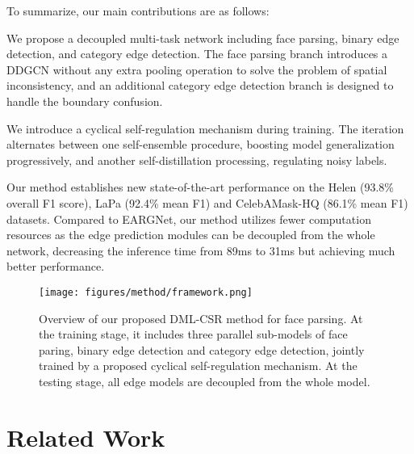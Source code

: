 \documentclass[10pt,twocolumn,letterpaper]{article}
\newenvironment{tight_itemize}{
\begin{itemize}[leftmargin=20pt]
  \setlength{\topsep}{0pt}
  \setlength{\itemsep}{0pt}
  \setlength{\parskip}{0pt}
  \setlength{\parsep}{0pt}
}{\end{itemize}}
\begin{document}
To summarize, our main contributions are as follows:
\vspace{-0.2cm}
\begin{tight_itemize}
\item We propose a decoupled multi-task network including face parsing, binary edge detection, and category edge detection. The face parsing branch introduces a DDGCN without any extra pooling operation to solve the problem of spatial inconsistency, and an additional category edge detection branch is designed to handle the boundary confusion.
\item We introduce a cyclical self-regulation mechanism during training. The iteration alternates between one self-ensemble procedure, boosting model generalization progressively, and another self-distillation processing, regulating noisy labels.
\item Our method establishes new state-of-the-art performance on the Helen\cite{helen} (93.8\% overall F1 score), LaPa\cite{lapa} (92.4\% mean F1) and CelebAMask-HQ\cite{CelebAMask-HQ} (86.1\% mean F1) datasets. Compared to EARGNet\cite{te2020edge}, our method utilizes fewer computation resources as the edge prediction modules can be decoupled from the whole network, decreasing the inference time from 89ms to 31ms but achieving much better performance.
\end{tight_itemize}

\begin{figure*}
\centering
\texttt{[image: figures/method/framework.png]}
\vspace{-2.5mm}
\caption{Overview of our proposed DML-CSR method for face parsing. At the training stage, it includes three parallel sub-models of face paring, binary edge detection and category edge detection, jointly trained by a proposed cyclical self-regulation mechanism. At the testing stage, all edge models are decoupled from the whole model.}
\vspace{-6mm}
\label{fig:framwork}
\end{figure*}

\section{Related Work}
\end{document}
